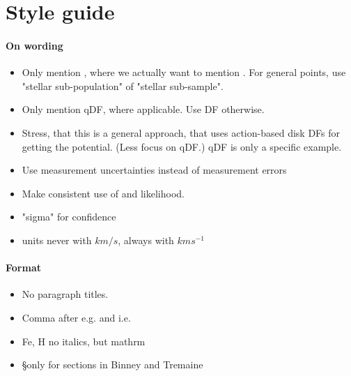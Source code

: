 \section{Style guide}

\paragraph{On wording}
\begin{itemize}
\item Only mention \MAP{}, where we actually want to mention \MAPs{}. For general points, use "stellar sub-population" of "stellar sub-sample".
\item Only mention qDF, where applicable. Use DF otherwise.
\item Stress, that this is a general approach, that uses action-based disk DFs for getting the potential. (Less focus on qDF.) qDF is only a specific example.
\item Use measurement uncertainties instead of measurement errors
\item Make consistent use of \pdf{} and likelihood.
\item "sigma" for confidence
\item units never with $km/s$, always with $km s^{-1}$
\end{itemize}

\paragraph{Format}
\begin{itemize}
\item No paragraph titles.
\item Comma after e.g. and i.e.
\item Fe, H no italics, but  mathrm
\item \S only for sections in Binney and Tremaine
\end{itemize}